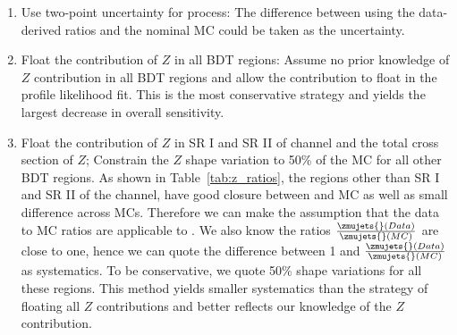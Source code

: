 \begin{enumerate}
\item Use two-point uncertainty for \zjets{} process: The difference between using the data-derived \zmujets{}ratios and the nominal \zjets{} MC could be taken as the uncertainty.  %

\item \label{item:z-treat-4} Float the contribution of $Z$ in all BDT regions: Assume no prior knowledge of $Z$ contribution in all BDT regions and allow the contribution to float in the profile likelihood fit. This is the most conservative strategy and yields the largest decrease in overall sensitivity. 

\item \label{item:z-treat-5} Float the contribution of $Z$ in SR I and SR II of \twocentral channel and the total cross section of $Z$; Constrain the $Z$ shape variation to 50\% of the \zjets{} MC for all other BDT regions.   %
As shown in Table~\ref{tab:z_ratios}, the regions other than SR I and SR II of the \twocentral channel, have good closure between \zjets{} and \zmujets{} MC as well as small difference across \zmujets{} MCs. Therefore we can make the assumption that the \zmujets{} data to MC ratios are applicable to \zjets{}. We also know the ratios $\frac{\zmujets{}(Data)}{\zmujets{}(MC)}$ are close to one, hence we can quote the difference between 1 and $\frac{\zmujets{}(Data)}{\zmujets{}(MC)}$ as systematics. To be conservative, we quote 50\% shape variations for all these regions. This method yields smaller systematics than the strategy of floating all $Z$ contributions and better reflects our knowledge of the $Z$ contribution.

\end{enumerate}



